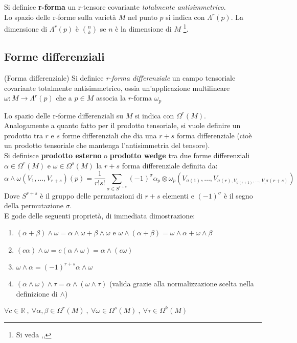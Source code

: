 Si definice \textbf{r-forma} un r-tensore covariante \emph{totalmente antisimmetrico}.\\

Lo spazio delle r-forme sulla varietà $M$ nel punto $p$ si indica con $\Lambda^r(p)$.
La dimensione di $\Lambda^r(p)$ è ${n}\choose{k}$ se $n$ è la dimensione di $M$
\footnote{ Si veda \cite{sernesi},\cite{boothby},\cite{nakahara} }.\\
\subsection{Forme differenziali}
\begin{definition}{(Forma differenziale)}
   Si definice \emph{r-forma differenziale} un campo tensoriale covariante
  totalmente antisimmetrico, ossia un'applicazione multilineare
  $\omega : M \to \Lambda^r(p)$ che a $p \in M$ associa la $r$-forma $\omega_p$
\end{definition}
Lo spazio delle r-forme differenziali su $M$ si indica con $\Omega^r(M)$.\\

Analogamente a quanto fatto per il prodotto tensoriale, si vuole definire un prodotto
tra $r$ e $s$ forme differenziali che dia una $r+s$ forma differenziale (cioè un
prodotto tensoriale che mantenga l'antisimmetria del tensore).\\

Si definisce \textbf{prodotto esterno} o \textbf{prodotto wedge} tra due forme
differenziali $\alpha \in \Omega^r(M)$ e $\omega \in \Omega^s(M)$ la $r+s$ forma
differenziale definita da:
$$ \alpha \wedge \omega (V_1,\dots,V_{r+s})(p) =
   \frac{1}{r!s!}\sum_{\sigma \in S^{r+s} } (-1)^\sigma
   \alpha_p\otimes\omega_p (V_{\sigma(1)}, \dots , V_{\sigma(r),
      V_{\sigma(r+1)}, \dots , V_,\sigma(r+s)})$$
Dove $S^{r+s}$ è il gruppo delle permutazioni di $r+s$ elementi e $(-1)^\sigma$
è il segno della permutazione $\sigma$.\\
E gode delle seguenti proprietà, di immediata dimostrazione:
\begin{enumerate}
    \item $(\alpha + \beta) \wedge \omega = \alpha\wedge\omega + \beta\wedge\omega$ e
          $\omega \wedge(\alpha + \beta)  = \omega\wedge\alpha + \omega\wedge\beta$
    \item $(c\alpha)\wedge\omega = c(\alpha\wedge\omega) = \alpha\wedge(c\omega)$
    \item $\omega\wedge\alpha = (-1)^{r+s} \alpha\wedge\omega$
    \item $(\alpha\wedge\omega)\wedge\tau = \alpha\wedge(\omega\wedge\tau)$
       (valida grazie alla normalizzazione scelta nella definizione di $\wedge$)
\end{enumerate}
$\forall c\in \mathbb{R} \: , \: \forall \alpha,\beta \in \Omega^r(M) \: , \:
   \forall \omega \in \Omega^s(M) \: , \: \forall \tau \in \Omega^k(M)$
\\

